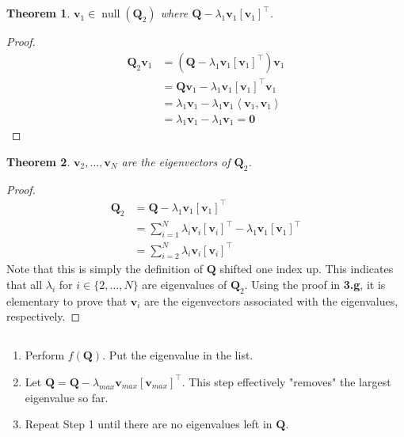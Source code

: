 \documentclass[]{article}
\newtheorem{genthm}{Theorem}
\newcommand{\iprod}[2]{\left\langle #1, #2 \right\rangle}
\newcommand{\tpose}[1]{\left[#1\right]^{\! \top} \!\!}
\begin{document}
\subsection{}

\begin{genthm}
	\(\bm{v}_1 \in \operatorname{null}(\bm{Q}_2)\) where \(\bm{Q} - \lambda_1 \bm{v}_1 \tpose{\bm{v}_1}\). 
\end{genthm}

\begin{proof}
\begin{align}
	\bm{Q}_2 \bm{v}_1 &= (\bm{Q} - \lambda_1 \bm{v}_1 \tpose{\bm{v}_1}) \bm{v}_1 \\
	&= \bm{Q} \bm{v}_1 - \lambda_1 \bm{v}_1 \tpose{\bm{v}_1} \bm{v}_1 \\
	&= \lambda_1 \bm{v}_1 - \lambda_1 \bm{v}_1 \iprod{\bm{v}_1}{\bm{v}_1} \\
	&= \lambda_1 \bm{v}_1 - \lambda_1 \bm{v}_1 = \bm{0}
\end{align}
\end{proof}

\begin{genthm}
	\(\bm{v}_2, \ldots, \bm{v}_N\) are the eigenvectors of \(\bm{Q}_2\). 
\end{genthm}

\begin{proof}
\begin{align}
	\bm{Q}_2 &= \bm{Q} - \lambda_1 \bm{v}_1 \tpose{\bm{v}_1} \\
	&= \sum_{i = 1}^{N} \lambda_i \bm{v}_i \tpose{\bm{v}_i} - \lambda_1 \bm{v}_1 \tpose{\bm{v}_1} \\
	&= \sum_{i = 2}^{N} \lambda_i \bm{v}_i \tpose{\bm{v}_i}
\end{align}
Note that this is simply the definition of \(\bm{Q}\) shifted one index up. 
This indicates that all \(\lambda_i\) for \(i \in \{2, \ldots, N\}\) are eigenvalues of \(\bm{Q}_2\). 
Using the proof in \textbf{3.g}, it is elementary to prove that \(\bm{v}_i\) are the eigenvectors associated with the eigenvalues, respectively. 
\end{proof}

\subsection{}

\begin{enumerate}
	\item Perform \(f(\bm{Q})\). Put the eigenvalue in the list. 
	\item Let \(\bm{Q} = \bm{Q} - \lambda_{max} \bm{v}_{max} \tpose{\bm{v}_{max}}\). 
	This step effectively "removes" the largest eigenvalue so far. 
	\item Repeat Step 1 until there are no eigenvalues left in \(\bm{Q}\). 
\end{enumerate}
\end{document}
